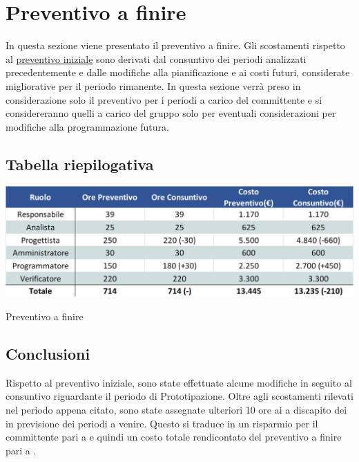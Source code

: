 \newpage
\section{Preventivo a finire} \label{PreventivoFinire}

In questa sezione viene presentato il preventivo a finire. Gli scostamenti rispetto al \hyperref[Preventivo]{preventivo iniziale} sono derivati dal consuntivo dei periodi analizzati precedentemente e dalle modifiche alla pianificazione e ai costi futuri, considerate migliorative per il periodo rimanente. In questa sezione verrà preso in considerazione solo il preventivo per i periodi a carico del committente e si considereranno quelli a carico del gruppo solo per eventuali considerazioni per modifiche alla programmazione futura.

\subsection{Tabella riepilogativa}
\begin{table}[h!]
	\centerline{\includegraphics[scale=0.60]{img/Preventivo/Consuntivo/PreventivoFinire.jpg}}
	\caption{Preventivo a finire}
\end{table}

\subsection{Conclusioni}
Rispetto al preventivo iniziale, sono state effettuate alcune modifiche in seguito al consuntivo riguardante il periodo di Prototipazione. Oltre agli scostamenti rilevati nel periodo appena citato, sono state assegnate ulteriori 10 ore ai \progrs{} a discapito dei \progs{} in previsione dei periodi a venire. Questo si traduce in un risparmio per il committente pari a  e quindi un costo totale rendicontato del preventivo a finire pari a .